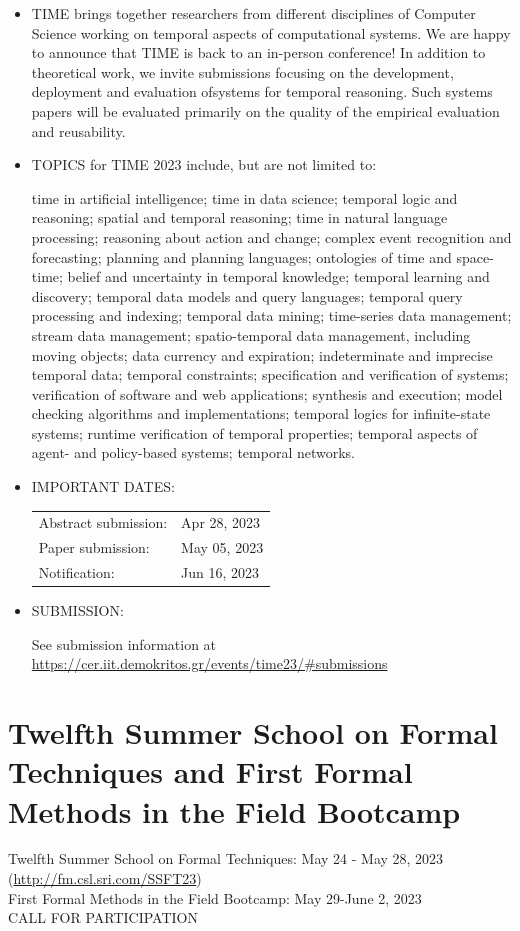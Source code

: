 \documentclass[prodmode,acmtecs]{acmsmall} %
\begin{document}
\begin{itemize}\item  TIME brings together researchers from different disciplines of Computer Science working on temporal aspects of computational systems. We are happy to announce that TIME is back to an in-person conference! In addition to theoretical work, we invite submissions focusing on the development, deployment and evaluation ofsystems for temporal reasoning. Such systems papers will be evaluated primarily on the quality of the empirical evaluation and reusability. 
 
\item  TOPICS for TIME 2023 include, but are not limited to:  
 
  time in artificial intelligence; time in data science; temporal logic and reasoning; spatial and temporal reasoning; time in natural language processing; reasoning about action and change; complex event recognition and forecasting; planning and planning languages; ontologies of time and space-time; belief and uncertainty in temporal knowledge; temporal learning and discovery; temporal data models and query languages; temporal query processing and indexing; temporal data mining; time-series data management; stream data management; spatio-temporal data management, including moving objects; data currency and expiration; indeterminate and imprecise temporal data; temporal constraints; specification and verification of systems; verification of software and web applications; synthesis and execution; model checking algorithms and implementations; temporal logics for infinite-state systems; runtime verification of temporal properties; temporal aspects of agent- and policy-based systems; temporal networks. 
 
\item  IMPORTANT DATES: 
 
\begin{tabulary}{\linewidth}{LL}Abstract submission:  & Apr 28, 2023 \\
Paper submission:  & May 05, 2023 \\
Notification:  & Jun 16, 2023 \\
\end{tabulary}
 
\item  SUBMISSION: 
 
  See submission information at \href{https://cer.iit.demokritos.gr/events/time23/#submissions}{https://cer.iit.demokritos.gr/events/time23/\#submissions} 
 
\end{itemize}\section{Twelfth Summer School on Formal Techniques and First Formal Methods in the Field Bootcamp}\label{TwelfthSummerSchoolonFormalTechniquesandFirstFormalMethodsintheFieldBootcamp}  Twelfth Summer School on Formal Techniques: May 24 - May 28, 2023 (\href{http://fm.csl.sri.com/SSFT23}{http://fm.csl.sri.com/SSFT23}) \\ 
  First Formal Methods in the Field Bootcamp: May 29-June 2, 2023\\ 
CALL FOR PARTICIPATION 
\end{document}

